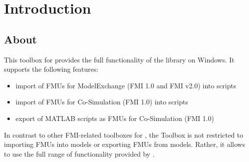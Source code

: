 \chapter{Introduction}


\section{About}

This toolbox for \matlab provides the full functionality of the \fmipp library on Windows.
It supports the following features:
\begin{itemize}
  \item import of FMUs for ModelExchange (FMI 1.0 and FMI v2.0) into \matlab scripts
  \item import of FMUs for Co-Simulation (FMI 1.0) into \matlab scripts
  \item export of MATLAB scripts as FMUs for Co-Simulation (FMI 1.0)
\end{itemize}
In contrast to other FMI-related toolboxes for \matlab, the \fmipp \matlab Toolbox is not restricted to importing FMUs into \simulink models or exporting FMUs from \simulink models.
Rather, it allows to use the full range of functionality provided by \matlab.
